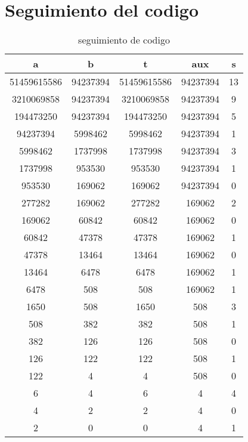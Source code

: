 \section{Seguimiento del codigo}
\begin{table}[H]
\label{tablax}
\begin{center}
\begin{tabular}{|c|c|c|c|c|}
\hline 
a&b&t&aux&s \\
\hline
51459615586&94237394&51459615586&94237394&13\\\hline
3210069858&94237394&3210069858&94237394&9\\\hline
194473250&94237394&194473250&94237394&5\\\hline
94237394&5998462&5998462&94237394&1\\\hline
5998462&1737998&1737998&94237394&3\\\hline
1737998&953530&953530&94237394&1\\\hline
953530&169062&169062&94237394&0\\\hline
277282&169062&277282&169062&2\\\hline
169062&60842&60842&169062&0\\\hline
60842&47378&47378&169062&1\\\hline
47378&13464&13464&169062&0\\\hline
13464&6478&6478&169062&1\\\hline
6478&508&508&169062&1\\\hline
1650&508&1650&508&3\\\hline
508&382&382&508&1\\\hline
382&126&126&508&0\\\hline
126&122&122&508&1\\\hline
122&4&4&508&0\\\hline
6&4&6&4&4\\\hline
4&2&2&4&0\\\hline
2&0&0&4&1\\\hline
\end{tabular}
\end{center}
\caption{seguimiento de codigo}
\end{table}
